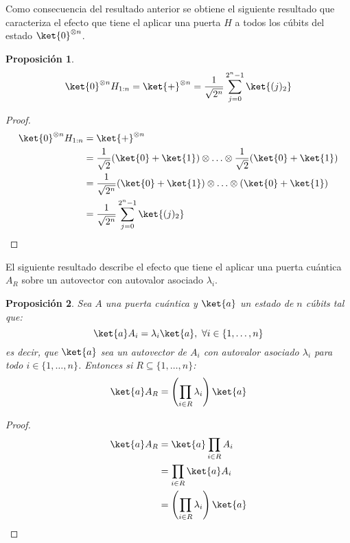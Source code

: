 \documentclass[10pt,conference,a4paper]{IEEEtran}
\newtheorem{prop}{Proposición}[section]
\begin{document}
    \vspace{1.5mm}
    Como consecuencia del resultado anterior se obtiene el siguiente resultado que caracteriza el efecto que tiene el aplicar una puerta $H$ a todos los cúbits del estado $\ket{0}^{\otimes n}$.
    \vspace{1.5mm}
    \begin{prop}
        \begin{equation}
            \ket{0}^{\otimes n} H_{1:n}=\ket{+}^{\otimes n}=\dfrac{1}{\sqrt{2^n}}\displaystyle\sum_{j=0}^{2^n-1}\ket{(j)_2}
        \end{equation}
        \label{prop:3}
    \end{prop}
    \begin{proof}
        \begin{align*}
            \ket{0}^{\otimes n}H_{1:n}&=\ket{+}^{\otimes n}\\
            &=\dfrac{1}{\sqrt{2}}(\ket{0}+\ket{1})\otimes\ldots\otimes\dfrac{1}{\sqrt{2}}(\ket{0}+\ket{1})\\
            &=\dfrac{1}{\sqrt{2^n}}(\ket{0}+\ket{1})\otimes\ldots\otimes(\ket{0}+\ket{1})\\
            &=\dfrac{1}{\sqrt{2^n}}\displaystyle\sum_{j=0}^{2^n-1}\ket{(j)_2}
        \end{align*}
    \end{proof}
    \vspace{1.5mm}
    El siguiente resultado describe el efecto que tiene el aplicar una puerta cuántica $A_R$ sobre un autovector con autovalor asociado $\lambda_i$.
    \vspace{1.5mm}
    \begin{prop}
        Sea $A$ una puerta cuántica y $\ket{a}$ un estado de $n$ cúbits tal que:
        $$\ket{a}A_i=\lambda_i\ket{a},\ \forall i\in \{1,\ldots, n\}$$
        es decir, que $\ket{a}$ sea un autovector de $A_i$ con autovalor asociado $\lambda_i$ para todo $i\in \{1,\ldots, n\}$. Entonces si
        $R\subseteq\{1,\ldots, n\}$:
        \begin{equation}
            \ket{a}A_R=\displaystyle\left(\prod_{i\in R}\lambda_i\right)\ket{a}
        \end{equation}
        \label{prop:3.5}
    \end{prop}
    \begin{proof}
        \begin{align*}
            \ket{a}A_R&=\ket{a}\displaystyle\prod_{i\in R}A_i\\
            &=\displaystyle\prod_{i\in R}\ket{a}A_i\\
            &=\displaystyle\left(\prod_{i\in R}\lambda_i\right)\ket{a}
        \end{align*}
    \end{proof}
\end{document}
